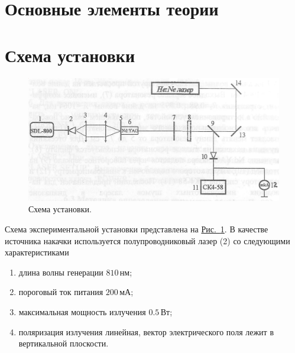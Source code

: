 \documentclass[12pt]{article}
\newcommand*{\figref}[2][]{\hyperref[#2]{Рис.~\ref*{#2}#1}}
\begin{document}
	
	\setcounter{page}{2}

	\tableofcontents
	\newpage

	\section{Основные элементы теории}

	\section{Схема установки}

	\begin{figure}[tb]
		\centering
		\includegraphics[width=\textwidth]{../figures/scheme.png}
		\caption{Схема установки.}
		\label{fig:scheme}
	\end{figure}

	Схема экспериментальной установки представлена на \figref{fig:scheme}. В качестве источника накачки используется полупроводниковый лазер (2) со следующими характеристиками
	\begin{enumerate}
		\item длина волны генерации $810\,\text{нм}$;
		\item пороговый ток питания $200\,\text{мА}$;
		\item максимальная мощность излучения $0.5\,\text{Вт}$;
		\item поляризация излучения линейная, вектор электрического поля лежит в вертикальной плоскости.
	\end{enumerate}
\end{document}
